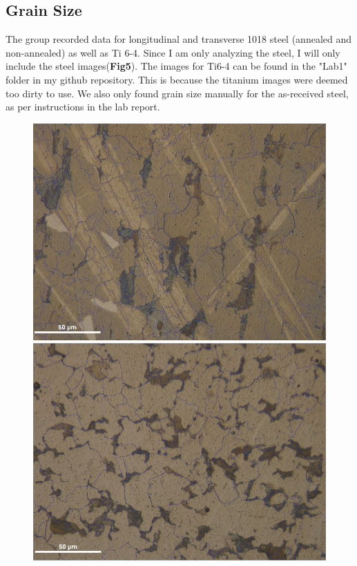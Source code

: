 \documentclass{article}
\begin{document}
\subsection{Grain Size}

The group recorded data for longitudinal and transverse 1018 steel (annealed and non-annealed) as well as Ti 6-4. Since I am only analyzing the steel, I will only include the steel images(\textbf{Fig5}). The images for Ti6-4 can be found in the "Lab1" folder in my github repository. This is because the titanium images were deemed too dirty to use. We also only found grain size manually for the as-received steel, as per instructions in the lab report.

\begin{figure}[h]
	\begin{minipage}{0.5\textwidth}
		\centering
		\includegraphics[scale=.35]{LASteelGrains.jpg}
	\end{minipage}
	\begin{minipage}{0.5\textwidth}
		\centering
		\includegraphics[scale=.35]{TASteelGrains.jpg}

\end{minipage}
\end{figure}
\end{document}

